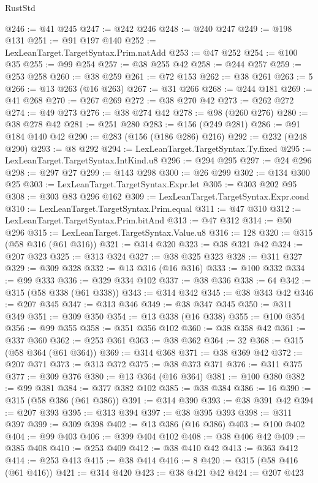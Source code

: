 \begin{lexlean}{RustStd}
\begin{coremodule}
{\begin{coremodule}
{{{{{{{{{{{{{{@246 := @41 @245
@247 := @242 @246
@248 := @240 @247
@249 := @198 @131
@251 := @91 @197 @140
@252 := LexLeanTarget.TargetSyntax.Prim.natAdd
@253 := @47 @252
@254 := @100 @35
@255 := @99 @254
@257 := @38 @255 @42
@258 := @244 @257
@259 := @253 @258
@260 := @38 @259
@261 := @72 @153
@262 := @38 @261
@263 := 5
@266 := @13 @263 (@16 @263)
@267 := @31 @266
@268 := @244 @181
@269 := @41 @268
@270 := @267 @269
@272 := @38 @270 @42
@273 := @262 @272
@274 := @49 @273
@276 := @38 @274 @42
@278 := @98 (@260 @276)
@280 := @38 @278 @42
@281 := @251 @280
@283 := @156 (@249 @281)
@286 := @91 @184 @140 @42
@290 := @283 (@156 (@186 @286) @216)
@292 := @232 (@248 @290)
@293 := @8 @292
@294 := LexLeanTarget.TargetSyntax.Ty.fixed
@295 := LexLeanTarget.TargetSyntax.IntKind.u8
@296 := @294 @295
@297 := @24 @296
@298 := @297 @27
@299 := @143 @298
@300 := @26 @299
@302 := @134 @300 @25
@303 := LexLeanTarget.TargetSyntax.Expr.let
@305 := @303 @202 @95
@308 := @303 @83 @296 @162
@309 := LexLeanTarget.TargetSyntax.Expr.cond
@310 := LexLeanTarget.TargetSyntax.Prim.equal
@311 := @47 @310
@312 := LexLeanTarget.TargetSyntax.Prim.bitAnd
@313 := @47 @312
@314 := @50 @296
@315 := LexLeanTarget.TargetSyntax.Value.u8
@316 := 128
@320 := @315 (@58 @316 (@61 @316))
@321 := @314 @320
@323 := @38 @321 @42
@324 := @207 @323
@325 := @313 @324
@327 := @38 @325 @323
@328 := @311 @327
@329 := @309 @328
@332 := @13 @316 (@16 @316)
@333 := @100 @332
@334 := @99 @333
@336 := @329 @334 @102
@337 := @38 @336
@338 := 64
@342 := @315 (@58 @338 (@61 @338))
@343 := @314 @342
@345 := @38 @343 @42
@346 := @207 @345
@347 := @313 @346
@349 := @38 @347 @345
@350 := @311 @349
@351 := @309 @350
@354 := @13 @338 (@16 @338)
@355 := @100 @354
@356 := @99 @355
@358 := @351 @356 @102
@360 := @38 @358 @42
@361 := @337 @360
@362 := @253 @361
@363 := @38 @362
@364 := 32
@368 := @315 (@58 @364 (@61 @364))
@369 := @314 @368
@371 := @38 @369 @42
@372 := @207 @371
@373 := @313 @372
@375 := @38 @373 @371
@376 := @311 @375
@377 := @309 @376
@380 := @13 @364 (@16 @364)
@381 := @100 @380
@382 := @99 @381
@384 := @377 @382 @102
@385 := @38 @384
@386 := 16
@390 := @315 (@58 @386 (@61 @386))
@391 := @314 @390
@393 := @38 @391 @42
@394 := @207 @393
@395 := @313 @394
@397 := @38 @395 @393
@398 := @311 @397
@399 := @309 @398
@402 := @13 @386 (@16 @386)
@403 := @100 @402
@404 := @99 @403
@406 := @399 @404 @102
@408 := @38 @406 @42
@409 := @385 @408
@410 := @253 @409
@412 := @38 @410 @42
@413 := @363 @412
@414 := @253 @413
@415 := @38 @414
@416 := 8
@420 := @315 (@58 @416 (@61 @416))
@421 := @314 @420
@423 := @38 @421 @42
@424 := @207 @423
}}}}}}}}}}}}}}
\end{coremodule}}
\end{coremodule}
\end{lexlean}
